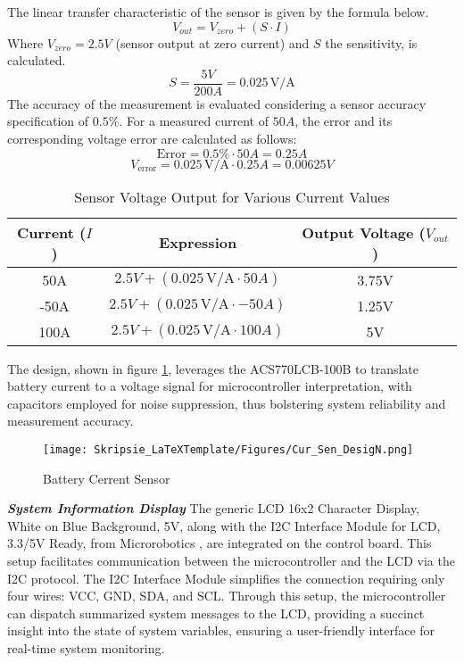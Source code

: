 \noindent
The linear transfer characteristic of the sensor is given by the formula below.
\[ V_{out} = V_{zero} + (S \cdot I) \]
\noindent
Where \(V_{zero} = 2.5V\) (sensor output at zero current) and \(S\) the sensitivity, is calculated.
\[ S = \frac{5V}{200A} = 0.025 \, \text{V/A} \]
\noindent
The accuracy of the measurement is evaluated considering a sensor accuracy specification of $0.5\%$. For a measured current of $50A$, the error and its corresponding voltage error are calculated as follows:
\begin{equation}
\label{eq:I_error}
\text{Error} = 0.5\% \cdot 50A = 0.25A
\end{equation}
\begin{equation}
\label{eq:V_error}
V_{\text{error}} = 0.025 \, \text{V/A} \cdot 0.25A = 0.00625V
\end{equation}

\begin{table}[h]
    \centering
    \caption{Sensor Voltage Output for Various Current Values}
    \label{tab:Sensor_Output}
    \begin{tabular}{|c|c|c|}
        \hline
        \textbf{Current (\(I\))} & \textbf{Expression} & \textbf{Output Voltage (\(V_{out}\))} \\
        \hline
        50A & \(2.5V + (0.025 \, \text{V/A} \cdot 50A)\) & 3.75V \\
        \hline
        -50A & \(2.5V + (0.025 \, \text{V/A} \cdot -50A)\) & 1.25V \\
        \hline
        100A & \(2.5V + (0.025 \, \text{V/A} \cdot 100A)\) & 5V \\
        \hline
    \end{tabular}
\end{table}

\noindent
The design, shown in figure \ref{fig:Mstr_D1}, leverages the ACS770LCB-100B to translate battery current to a voltage signal for microcontroller interpretation, with capacitors employed for noise suppression, thus bolstering system reliability and measurement accuracy.

\begin{figure}[h!]
\centering
\texttt{[image: Skripsie\_LaTeXTemplate/Figures/Cur\_Sen\_DesigN.png]}
\caption{Battery Cerrent Sensor \cite{currentSensori}}
\label{fig:Mstr_D1}
\end{figure}
\newpage
\noindent
\textbf{\emph{System Information Display}}\label{subsubsec:LCD_Dsgn}\newline
\noindent
The generic LCD 16x2 Character Display, White on Blue Background, 5V, along with the I2C Interface Module for LCD, 3.3/5V Ready, from Microrobotics \cite{LCD_MR}, are integrated on the control board. This setup facilitates communication between the microcontroller and the LCD via the I2C protocol. The I2C Interface Module simplifies the connection requiring only four wires: VCC, GND, SDA, and SCL. Through this setup, the microcontroller can dispatch summarized system messages to the LCD, providing a succinct insight into the state of system variables, ensuring a user-friendly interface for real-time system monitoring.

